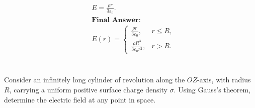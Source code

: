 \documentclass[12pt]{article}
\begin{document}
\begin{correctionbox}
	\begin{align*}
		 & E = \frac{\rho r}{3 \varepsilon_0}. \\
		 & \textbf{Final Answer:}              \\
		 & E(r) =
		\begin{cases}
			\frac{\rho r}{3 \varepsilon_0},       & r \leq R, \\
			\frac{\rho R^3}{3 \varepsilon_0 r^2}, & r > R.
		\end{cases}
	\end{align*}
\end{correctionbox}

\section{}
Consider an infinitely long cylinder of revolution along the $ OZ $-axis, with radius $ R $, carrying a uniform positive surface charge density $ \sigma $. Using Gauss's theorem, determine the electric field at any point in space.
\end{document}
